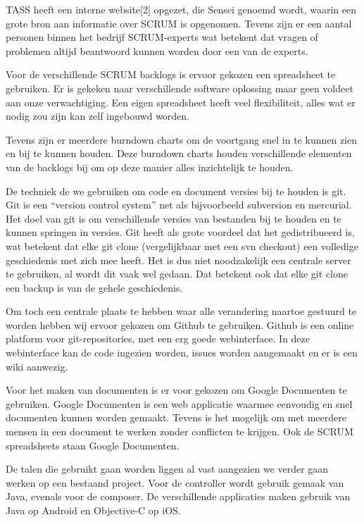 \documentclass{article}
\begin{document}
TASS heeft een interne website[2] opgezet, die Sensei genoemd wordt, waarin
een grote bron aan informatie over SCRUM is opgenomen. Tevens zijn er een
aantal personen binnen het bedrijf SCRUM-experts wat betekent dat vragen of
problemen altijd beantwoord kunnen worden door een van de experts.

Voor de verschillende SCRUM backlogs is ervoor gekozen een spreadsheet te
gebruiken. Er is gekeken naar verschillende software oplossing maar geen
voldeet aan onze verwachtiging. Een eigen spreadsheet heeft veel
flexibiliteit, alles wat er nodig zou zijn kan zelf ingebouwd worden.

Tevens zijn er meerdere burndown charts om de voortgang snel in te kunnen
zien en bij te kunnen houden. Deze burndown charts houden verschillende
elementen van de backlogs bij om op deze manier alles inzichtelijk te
houden.

De techniek de we gebruiken om code en document versies bij te houden is
git. Git is een “version control system” net als bijvoorbeeld subversion en
mercurial. Het doel van git is om verschillende versies van bestanden bij
te houden en te kunnen springen in versies. Git heeft als grote voordeel
dat het gedistribueerd is, wat betekent dat elke git clone (vergelijkbaar
met een svn checkout) een volledige geschiedenis met zich mee heeft. Het is
dus niet noodzakelijk een centrale server te gebruiken, al wordt dit vaak
wel gedaan. Dat betekent ook dat elke git clone een backup is van de gehele
geschiedenis.

Om toch een centrale plaats te hebben waar alle verandering naartoe
gestuurd te worden hebben wij ervoor gekozen om Github te gebruiken. Github
is een online platform voor git-repositories, met een erg goede
webinterface. In deze webinterface kan de code ingezien worden, issues
worden aangemaakt en er is een wiki aanwezig.

Voor het maken van documenten is er voor gekozen om Google Documenten te
gebruiken. Google Documenten is een web applicatie waarmee eenvoudig en
snel documenten kunnen worden gemaakt. Tevens is het mogelijk om met
meerdere mensen in een document te werken zonder conflicten te krijgen. Ook
de SCRUM spreadsheets staan Google Documenten.

De talen die gebruikt gaan worden liggen al vast aangezien we verder gaan
werken op een bestaand project. Voor de controller wordt gebruik gemaak van
Java, evenals voor de composer. De verschillende applicaties maken gebruik
van Java op Android en Objective-C op iOS.
\end{document}
